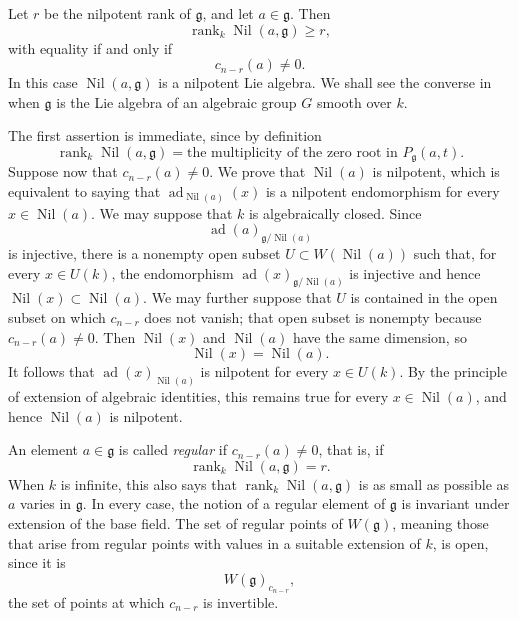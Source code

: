 \begin{proposition}
Let \(r\) be the nilpotent rank of \(\mathfrak g\), and let
\(a\in\mathfrak g\). Then
\[
  \operatorname{rank}_k\operatorname{Nil}(a,\mathfrak g)\geq r,
\]
with equality if and only if
\[
  c_{n-r}(a)\neq0.
\]
In this case \(\operatorname{Nil}(a,\mathfrak g)\) is a nilpotent
Lie algebra. We shall see the converse in  when
\(\mathfrak g\) is the Lie algebra of an algebraic group \(G\)
smooth over \(k\).
\end{proposition}

The first assertion is immediate, since by definition
\[
  \operatorname{rank}_k\operatorname{Nil}(a,\mathfrak g)
  =
  \text{the multiplicity of the zero root in }P_{\mathfrak g}(a,t).
\]
Suppose now that \(c_{n-r}(a)\neq0\). We prove that
\(\operatorname{Nil}(a)\) is nilpotent, which is equivalent to saying
that \(\operatorname{ad}_{\operatorname{Nil}(a)}(x)\) is a nilpotent
endomorphism for every \(x\in\operatorname{Nil}(a)\). We may suppose
that \(k\) is algebraically closed. Since
\[
  \operatorname{ad}(a)_{\mathfrak g/\operatorname{Nil}(a)}
\]
is injective, there is a nonempty open subset
\(U\subset W(\operatorname{Nil}(a))\) such that, for every
\(x\in U(k)\), the endomorphism
\(\operatorname{ad}(x)_{\mathfrak g/\operatorname{Nil}(a)}\) is
injective and hence
\(\operatorname{Nil}(x)\subset\operatorname{Nil}(a)\). We may further
suppose that \(U\) is contained in the open subset on which
\(c_{n-r}\) does not vanish; that open subset is nonempty because
\(c_{n-r}(a)\neq0\). Then
\(\operatorname{Nil}(x)\) and \(\operatorname{Nil}(a)\) have the same
dimension, so
\[
  \operatorname{Nil}(x)=\operatorname{Nil}(a).
\]
It follows that
\(\operatorname{ad}(x)_{\operatorname{Nil}(a)}\) is nilpotent for
every \(x\in U(k)\). By the principle of extension of algebraic
identities, this remains true for every
\(x\in\operatorname{Nil}(a)\), and hence \(\operatorname{Nil}(a)\) is
nilpotent.

An element \(a\in\mathfrak g\) is called \emph{regular} if
\(c_{n-r}(a)\neq0\), that is, if
\[
  \operatorname{rank}_k\operatorname{Nil}(a,\mathfrak g)=r.
\]
When \(k\) is infinite, this also says that
\(\operatorname{rank}_k\operatorname{Nil}(a,\mathfrak g)\) is as
small as possible as \(a\) varies in \(\mathfrak g\). In every case,
the notion of a regular element of \(\mathfrak g\) is invariant under
extension of the base field. The set of regular points of
\(W(\mathfrak g)\), meaning those that arise from regular points with
values in a suitable extension of \(k\), is open, since it is
\[
  W(\mathfrak g)_{c_{n-r}},
\]
the set of points at which \(c_{n-r}\) is invertible.

